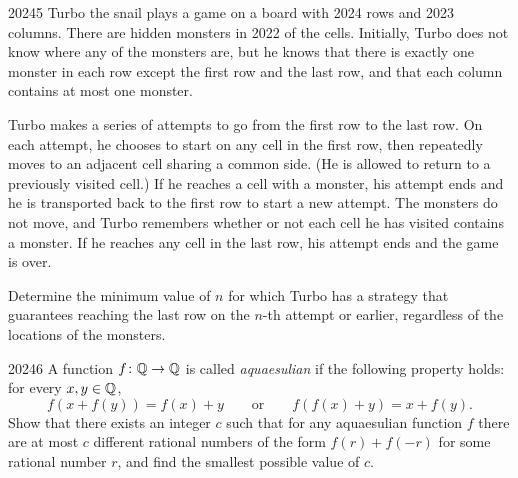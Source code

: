 \begin{problem}{2024}{5}
Turbo the snail plays a game on a board with 2024 rows and 2023 columns. There are hidden monsters in 2022 of the cells. Initially, Turbo does not know where any of the monsters are, but he knows that there is exactly one monster in each row except the first row and the last row, and that each column contains at most one monster.

Turbo makes a series of attempts to go from the first row to the last row. On each attempt, he chooses to start on any cell in the first row, then repeatedly moves to an adjacent cell sharing a common side. (He is allowed to return to a previously visited cell.) If he reaches a cell with a monster, his attempt ends and he is transported back to the first row to start a new attempt. The monsters do not move, and Turbo remembers whether or not each cell he has visited contains a monster. If he reaches any cell in the last row, his attempt ends and the game is over.

Determine the minimum value of $n$ for which Turbo has a strategy that guarantees reaching the last row on the $n$-th attempt or earlier, regardless of the locations of the monsters.
\end{problem}

\begin{problem}{2024}{6}
A function $f\colon\mathbb{Q}\to\mathbb{Q}$ is called \emph{aquaesulian} if the following property holds: for every $x, y\in\mathbb{Q}$,
\[
    f(x+f(y))=f(x)+y
    \qquad\text{or}\qquad
    f(f(x)+y)=x+f(y).
\]
Show that there exists an integer $c$ such that for any aquaesulian function $f$ there are at most $c$ different rational numbers of the form $f(r)+f(-r)$ for some rational number $r$, and find the smallest possible value of $c$.
\end{problem}
